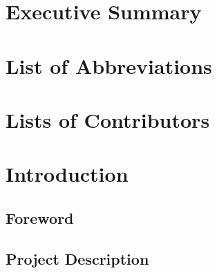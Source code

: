 \documentclass[
  11pt,
]{article}
\begin{document}
\clearpage

\renewcommand{\baselinestretch}{0.6}\normalsize
\setcounter{tocdepth}{3}
\tableofcontents
\renewcommand{\baselinestretch}{1.0}\normalsize

\clearpage

\listoffigures
\listoftables

\clearpage

\hypertarget{executive-summary}{%
\section*{Executive Summary}\label{executive-summary}}

\clearpage

\hypertarget{list-of-abbreviations}{%
\section*{List of Abbreviations}\label{list-of-abbreviations}}

\clearpage

\hypertarget{lists-of-contributors}{%
\section*{Lists of Contributors}\label{lists-of-contributors}}

\clearpage


\clearpage

\hypertarget{introduction}{%
\section{Introduction}\label{introduction}}

\hypertarget{foreword}{%
\subsection{Foreword}\label{foreword}}

\hypertarget{project-description}{%
\subsection{Project Description}\label{project-description}}
\end{document}
